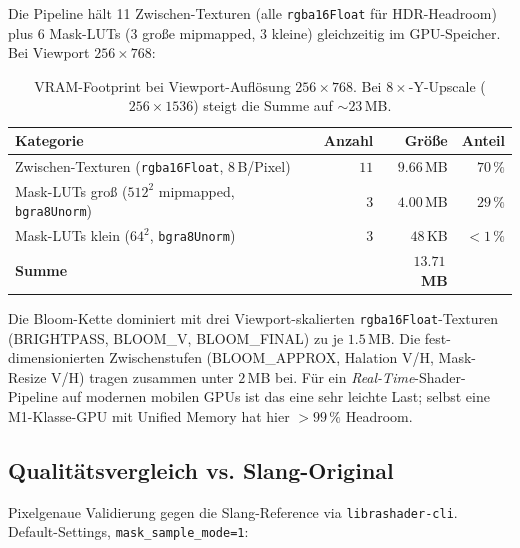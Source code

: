 \documentclass[11pt, a4paper]{article}
\newcommand{\tableheadercolor}{\rowcolor{hkared}}
\newcommand{\thw}[1]{\color{white}\textbf{#1}}  %
\begin{document}
Die Pipeline h\"alt 11 Zwischen-Texturen (alle \texttt{rgba16Float} f\"ur HDR-Headroom) plus 6 Mask-LUTs (3 gro{\ss}e mipmapped, 3 kleine) gleichzeitig im GPU-Speicher. Bei Viewport $256 \times 768$:

\vspace{.25cm}
\begin{table}[H]
\centering
\small
{}
\begin{tabularx}{\textwidth}{Xrrr}
    \toprule
    \tableheadercolor \thw{Kategorie} & \thw{Anzahl} & \thw{Gr\"o{\ss}e} & \thw{Anteil} \\
    \midrule
    Zwischen-Texturen (\texttt{rgba16Float}, $8\,$B/Pixel)  & $11$ & $9.66\,$MB & $70\,\%$ \\
    Mask-LUTs gro{\ss} ($512^2$ mipmapped, \texttt{bgra8Unorm}) & $3$  & $4.00\,$MB & $29\,\%$ \\
    Mask-LUTs klein ($64^2$, \texttt{bgra8Unorm})  & $3$  & $48\,$KB   & $< 1\,\%$ \\
    \midrule
    \textbf{Summe} & & $\mathbf{13.71\,}$\textbf{MB} & \\
    \bottomrule
\end{tabularx}
 \vspace{.25cm}
\caption{VRAM-Footprint bei Viewport-Aufl\"osung $256 \times 768$. Bei $8\times$-Y-Upscale ($256 \times 1536$) steigt die Summe auf $\sim 23\,$MB.}
\label{tab:vram}
\end{table}

Die Bloom-Kette dominiert mit drei Viewport-skalierten \texttt{rgba16Float}-Texturen (BRIGHTPASS, BLOOM\_V, BLOOM\_FINAL) zu je $1.5\,$MB. Die fest-dimensionierten Zwischenstufen (BLOOM\_APPROX, Halation V/H, Mask-Resize V/H) tragen zusammen unter $2\,$MB bei. F\"ur ein \emph{Real-Time}-Shader-Pipeline auf modernen mobilen GPUs ist das eine sehr leichte Last; selbst eine M1-Klasse-GPU mit Unified Memory hat hier $> 99\,\%$ Headroom.

\vspace{.5cm}
\subsection{Qualit\"atsvergleich vs. Slang-Original}
\vspace{.25cm}

Pixelgenaue Validierung gegen die Slang-Reference via \texttt{librashader-cli}. Default-Settings, \texttt{mask\_sample\_mode=1}:
\end{document}

